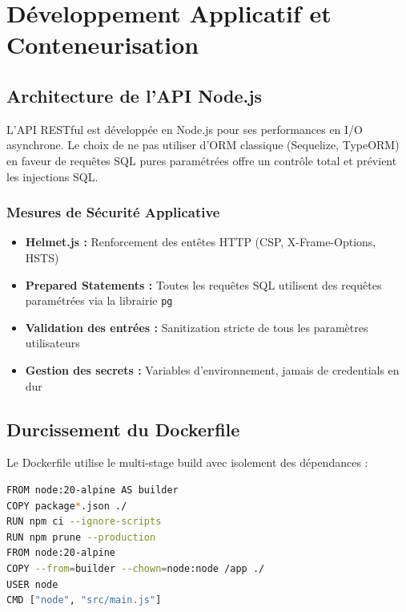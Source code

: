 \documentclass[12pt,a4paper]{article}
\begin{document}
\clearpage
\section{Développement Applicatif et Conteneurisation}

\subsection{Architecture de l'API Node.js}

L'API RESTful est développée en Node.js pour ses performances en I/O asynchrone. Le choix de ne pas utiliser d'ORM classique (Sequelize, TypeORM) en faveur de requêtes SQL pures paramétrées offre un contrôle total et prévient les injections SQL.

\subsubsection{Mesures de Sécurité Applicative}

\begin{itemize}
    \item \textbf{Helmet.js :} Renforcement des entêtes HTTP (CSP, X-Frame-Options, HSTS)
    \item \textbf{Prepared Statements :} Toutes les requêtes SQL utilisent des requêtes paramétrées via la librairie \texttt{pg}
    \item \textbf{Validation des entrées :} Sanitization stricte de tous les paramètres utilisateurs
    \item \textbf{Gestion des secrets :} Variables d'environnement, jamais de credentials en dur
\end{itemize}

\subsection{Durcissement du Dockerfile}

Le Dockerfile utilise le multi-stage build avec isolement des dépendances :

\begin{lstlisting}[language=bash, caption=Dockerfile multi-stage]
FROM node:20-alpine AS builder
COPY package*.json ./
RUN npm ci --ignore-scripts
RUN npm prune --production
FROM node:20-alpine
COPY --from=builder --chown=node:node /app ./
USER node
CMD ["node", "src/main.js"]
\end{lstlisting}
\end{document}
